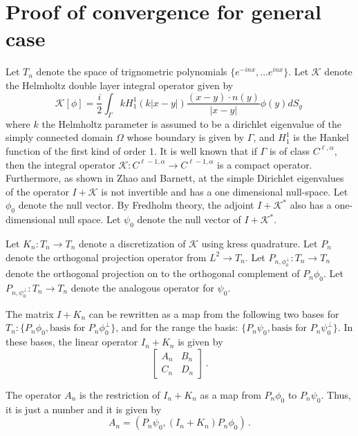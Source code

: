 \section{Proof of convergence for general case}
Let $T_{n}$ denote the space of trignometric polynomials
$\{ e^{-inx}, \ldots e^{inx} \}$. 
Let $\mathcal{K}$ denote the Helmholtz double layer integral operator
given by
\begin{equation}
\mathcal{K}[\phi] = \frac{i}{2}\int_{\Gamma} k H_{1}^{1}(k|x-y|) \frac{(x-y)\cdot n(y)}{|x-y|} \phi(y) dS_{y} \,
\end{equation}
where $k$ the Helmholtz parameter is assumed to be a dirichlet eigenvalue of the simply connected
domain $\Omega$ whose boundary is given by $\Gamma$, and $H_{1}^{1}$ is the Hankel function
of the first kind of order $1$.
It is well known that if $\Gamma$ is of class $C^{\ell,\alpha}$, then the
integral operator $\mathcal{K}: C^{\ell-1,\alpha} \to C^{\ell-1,\alpha}$ is a compact operator.
Furthermore, as shown in Zhao and Barnett, at the simple Dirichlet eigenvalues of the operator
$I + \mathcal{K}$ is not invertible and has a one dimensional null-space. Let $\phi_{0}$ denote
the null vector. 
By Fredholm theory, the adjoint $I + \mathcal{K}^{\ast}$ also has a one-dimensional null space.
Let $\psi_{0}$ denote the null vector of $I+\mathcal{K}^{\ast}$.


Let $K_{n}: T_{n} \to T_{n}$ 
denote a discretization of $\mathcal{K}$ 
using kress quadrature. 
Let $P_{n}$ denote the orthogonal 
projection operator from $L^{2} \to T_{n}$.
Let $P_{n,\phi_{0}^{\perp}}: T_{n} \to T_{n}$ denote the orthogonal
projection on to the orthogonal complement of $P_{n} \phi_{0}$.
Let $P_{n,\psi_{0}^{\perp}}: T_{n} \to T_{n}$ denote the
analogous operator for $\psi_{0}$. 

The matrix $I+K_{n}$ can be rewritten as a map from the
following two bases for $T_{n}: \{ P_{n} \phi_{0}, \text{basis for }
P_{n}\phi_{0}^{\perp} \}$, and for the range the basis:
$\{ P_{n} \psi_{0}, \text{basis for } P_{n} \psi_{0}^{\perp} \}$.
In these bases, the linear operator $I_{n} + K_{n}$ is given by
\begin{equation}
\begin{bmatrix}
A_{n} & B_{n} \\
C_{n} & D_{n} 
\end{bmatrix} \, .
\end{equation}

The operator $A_{n}$
is the restriction of $I_{n} + K_{n}$ as a map from $P_{n} \phi_{0}$ 
to $P_{n} \psi_{0}$. Thus, it is just a number and it is given by
\begin{equation}
A_{n} = \left(P_{n} \psi_{0}, (I_{n} + K_{n}) P_{n} \phi_{0} \right) \,.
\end{equation}

